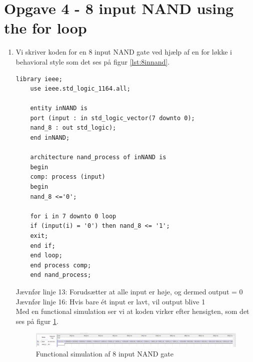 \section{Opgave 4 - 8 input NAND using the for loop}
\begin{enumerate}
	\item[1)]
	Vi skriver koden for en 8 input NAND gate ved hjælp af en for løkke i behavioral style som det ses på figur \ref{lst:8innand}.\\
	\begin{lstlisting}[caption={Behavioral style kode for en 8 input NAND gate},label={lst:8innand}]
	library ieee;
	use ieee.std_logic_1164.all;
	
	entity inNAND is
	port (input : in std_logic_vector(7 downto 0);
	nand_8 : out std_logic);
	end inNAND;
	
	architecture nand_process of inNAND is
	begin
	comp: process (input)
	begin
	nand_8 <='0';
	
	for i in 7 downto 0 loop
	if (input(i) = '0') then nand_8 <= '1'; 
	exit;
	end if;
	end loop;
	end process comp;
	end nand_process;
	\end{lstlisting}
	Jævnfør linje 13: Forudsætter at alle input er høje, og dermed output = 0\\
	Jævnfør linje 16: Hvis bare ét input er lavt, vil output blive 1\\
	\clearpage
	Med en functional simulation ser vi at koden virker efter hensigten, som det ses på figur \ref{fig:8innand}.\\
	\begin{figure}[h]
		\centering
		\includegraphics[scale=0.4]{pictures/Oevelse5/opg4/func_sim_8nand.JPG}
		\caption{Functional simulation af 8 input NAND gate}
		\label{fig:8innand}
	\end{figure}
\end{enumerate}